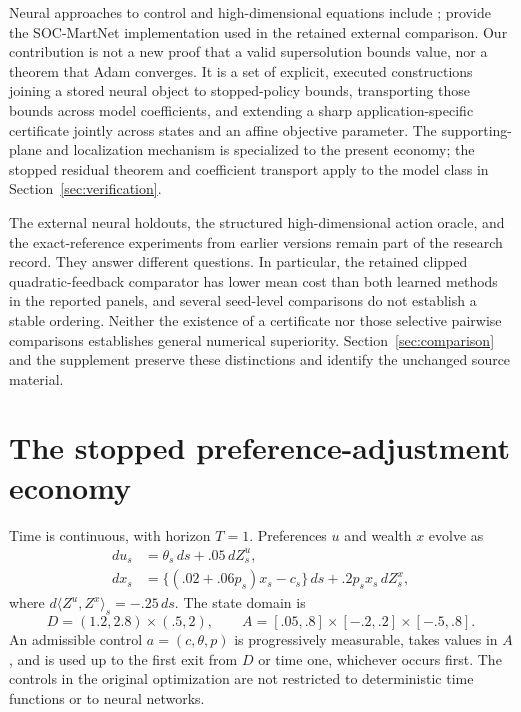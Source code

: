 Neural approaches to control and high-dimensional equations include \citet{HanE2016,HanJentzenE2018}; \citet{CaiFangZhou2025} provide the SOC-MartNet implementation used in the retained external comparison. Our contribution is not a new proof that a valid supersolution bounds value, nor a theorem that Adam converges. It is a set of explicit, executed constructions joining a stored neural object to stopped-policy bounds, transporting those bounds across model coefficients, and extending a sharp application-specific certificate jointly across states and an affine objective parameter. The supporting-plane and localization mechanism is specialized to the present economy; the stopped residual theorem and coefficient transport apply to the model class in Section~\ref{sec:verification}.

The external neural holdouts, the structured high-dimensional action oracle, and the exact-reference experiments from earlier versions remain part of the research record. They answer different questions. In particular, the retained clipped quadratic-feedback comparator has lower mean cost than both learned methods in the reported panels, and several seed-level comparisons do not establish a stable ordering. Neither the existence of a certificate nor those selective pairwise comparisons establishes general numerical superiority. Section~\ref{sec:comparison} and the supplement preserve these distinctions and identify the unchanged source material.

\section{The stopped preference-adjustment economy}\label{sec:economy}
Time is continuous, with horizon $T=1$. Preferences $u$ and wealth $x$ evolve as
\begin{align}
 du_s&=\theta_s\,ds+.05\,dZ^u_s,\label{eq:u}\\
 dx_s&=\{(.02+.06p_s)x_s-c_s\}\,ds+.2p_sx_s\,dZ^x_s,\label{eq:x}
\end{align}
where $d\langle Z^u,Z^x\rangle_s=-.25\,ds$. The state domain is
\[
 D=(1.2,2.8)\times(.5,2),
 \qquad A=[.05,.8]\times[-.2,.2]\times[-.5,.8].
\]
An admissible control $a=(c,\theta,p)$ is progressively measurable, takes values in $A$, and is used up to the first exit from $D$ or time one, whichever occurs first. The controls in the original optimization are not restricted to deterministic time functions or to neural networks.

